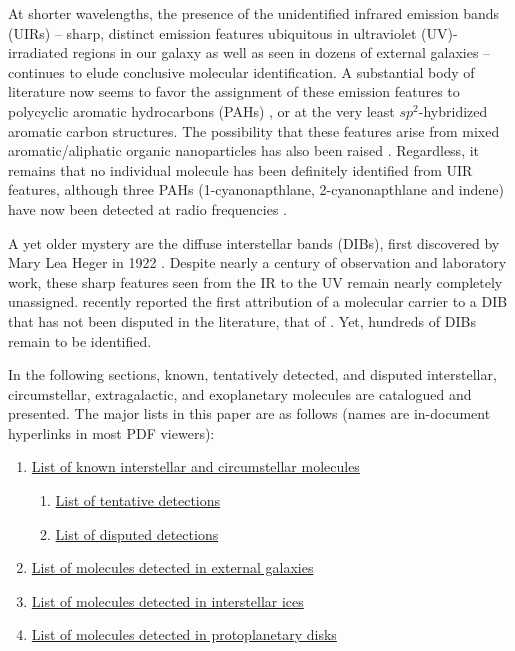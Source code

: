 \documentclass[twocolumn]{aastex631}
\newcommand{\update}[1]{{#1}}
\begin{document}
At shorter wavelengths, the presence of the unidentified infrared emission bands (UIRs) -- sharp, distinct emission features ubiquitous in ultraviolet (UV)-irradiated regions in our galaxy as well as seen in dozens of external galaxies -- continues to elude conclusive molecular identification.  A substantial body of literature now seems to favor the assignment of these emission features to polycyclic aromatic hydrocarbons (PAHs) \citep{Tielens:2008fx}, or at the very least $sp^2$-hybridized aromatic carbon structures.  The possibility that these features arise from mixed aromatic/aliphatic organic nanoparticles has also been raised \citep{Kwok:2013gq}.  Regardless, it remains that no individual molecule has been definitely identified from UIR features, \update{although three PAHs (1-cyanonapthlane, 2-cyanonapthlane and indene) have now been detected at radio frequencies \citep{McGuire:2021aa,Burkhardt:2021ji,2021A&A...649L..15C}}.

A yet older mystery are the diffuse interstellar bands (DIBs), first discovered by Mary Lea Heger in 1922 \citep{McCall:2013db}.  Despite nearly a century of observation and laboratory work, these sharp features seen from the IR to the UV remain nearly completely unassigned.  \citet{Campbell:2015hp} recently reported the first attribution of a molecular carrier to a DIB that has not been disputed in the literature, that of .  Yet, hundreds of DIBs remain to be identified.

In the following sections, known, tentatively detected, and disputed interstellar, circumstellar, extragalactic, and exoplanetary molecules are catalogued and presented.  The major lists in this paper are as follows (names are in-document hyperlinks in most PDF viewers):

\begin{enumerate}
    \item \hyperref[known]{List of known interstellar and circumstellar molecules}
    \begin{enumerate}
        \item \hyperref[tentative]{List of tentative detections}
        \item \hyperref[disputed]{List of disputed detections}
    \end{enumerate}
    \item \hyperref[exgals]{List of molecules detected in external galaxies}
    \item \hyperref[ices]{List of molecules detected in interstellar ices}
    \item \hyperref[ppds]{List of molecules detected in protoplanetary disks}
\end{enumerate}
\end{document}
